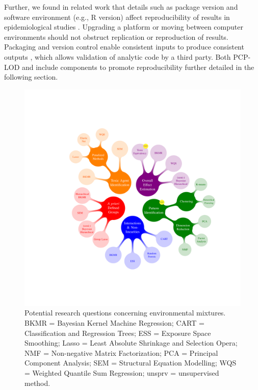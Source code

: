 Further, we found in related work that details such as package version and software environment (e.g., R version) affect reproducibility of results in epidemiological studies \cite{nunez2020reflection}. Upgrading a platform or moving between computer environments should not obstruct replication or reproduction of results. Packaging and version control enable consistent inputs to produce consistent outputs \cite{wilson2014best}, which allows validation of analytic code by a third party. Both PCP-LOD and \bnmf include components to promote reproducibility further detailed in the following section.

\begin{figure}[!ht]
\centering
\includegraphics[scale = 0.305]{./figures/gibson_dissertation_image.pdf}
\caption[Main questions in mixtures analyses]{Potential research questions concerning environmental mixtures. BKMR = Bayesian Kernel Machine Regression; CART = Classification and Regression Trees; ESS = Exposure Space Smoothing; Lasso = Least Absolute Shrinkage and Selection Opera; NMF = Non-negative Matrix Factorization; PCA = Principal Component Analysis; SEM = Structural Equation Modelling; WQS = Weighted Quantile Sum Regression; unsprv = unsupervised method.}
\label{fig:blobs}
\end{figure}

